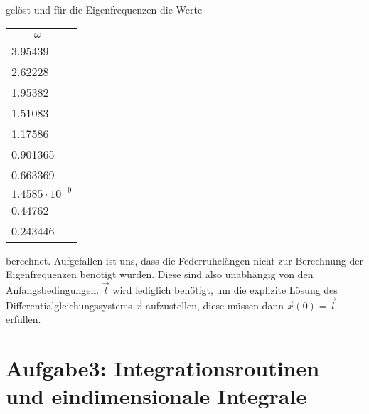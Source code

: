 \noindent
gelöst und für die Eigenfrequenzen die Werte

\FloatBarrier
\begin{table}[h]
    \centering
    \begin{tabular}{l}
        \textbf{$\qquad \omega$} \\
        \toprule 3.95439 \\ 2.62228 \\ 1.95382 \\ 1.51083 \\ 1.17586 \\ 0.901365 \\ 0.663369 \\ $1.4585\cdot 10^{-9}$ \\ 0.44762 \\ 0.243446 \\
        \bottomrule
    \end{tabular}
\end{table}
\noindent
\FloatBarrier
\noindent
berechnet. Aufgefallen ist uns, dass die Federruhelängen nicht zur Berechnung der Eigenfrequenzen benötigt wurden. Diese sind also unabhängig von den Anfangsbedingungen. $\vec{l}$ wird lediglich benötigt, um die explizite Lösung des Differentialgleichungssystems $\vec{x}$ aufzustellen, diese müssen dann $\vec{x}(0) = \vec{l}$ erfüllen.

\section*{Aufgabe3: Integrationsroutinen und eindimensionale Integrale}


